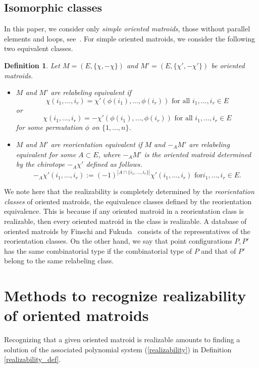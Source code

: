 \documentclass{article}
\newtheorem{defn2}[thm]{\bfseries Definition}
\begin{document}
\subsection{Isomorphic classes}
In this paper, we consider only {\it simple oriented matroids}, those without parallel elements and loops, see~\cite{BLSWZ99}.
For simple oriented matroids, we consider the following two equivalent classes.
\begin{defn2} Let $M=(E,\{ \chi, -\chi \} )$ and $M'=(E,\{ \chi', -\chi' \} )$ be oriented matroids.
\begin{itemize}
\item[(a)] $M$ and $M'$ are {\it relabeling equivalent\/} if
\[ \chi(i_{1},\dots,i_{r})=\chi '(\phi (i_{1}),\dots,\phi (i_{r})) \text{ for all $i_1,\dots,i_r \in E$} \]
  or
\[ \chi(i_{1},\dots,i_{r})=- \chi '(\phi (i_{1}),\dots,\phi (i_{r})) \text{ for all $i_1,\dots,i_r \in E$}\]
for some permutation $\phi$ on $\{ 1,\dots,n\}$.
\item[(b)] $M$ and $M'$ are {\it reorientation equivalent\/} if $M$ and $-_{A}M'$ are relabeling equivalent for some $A \subset E$,
where $-_{A}M'$ is the oriented matroid determined by the chirotope $-_{A}\chi'$ defined as follows. 
\[ -_{A}\chi' (i_1,\dots,i_r):=(-1)^{|A \cap \{ i_1,\dots,i_r\} |}\chi'(i_1,\dots,i_r) \text{ for
$i_1,\dots,i_r \in E$.} \]
\end{itemize}
\end{defn2}
We note here that the realizability is completely determined by the {\it reorientation classes} of oriented matroids, the equivalence
classes defined by the reorientation equivalence. 
This is because  if any oriented matroid in a reorientation class
is realizable, then every oriented matroid in the class is realizable. 
A database of oriented matroids by Finschi and Fukuda~\cite{FF} consists of the representatives of the reorientation classes.
On the other hand, we say that point configurations $P,P'$ has the same combinatorial type 
if the combinatorial type of $P$ and that of $P'$ belong to the same relabeling class.





\section{Methods to recognize realizability of oriented matroids}
Recognizing that a given oriented matroid is realizable amounts to
 finding a solution of the associated polynomial system (\ref{realizability})
in Definition \ref{realizability_def}.
\end{document}
